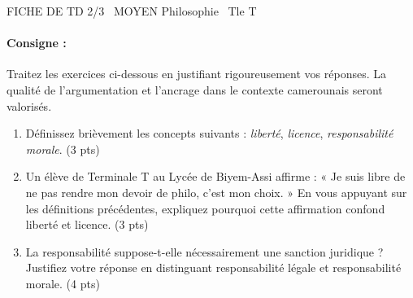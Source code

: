 \documentclass[11pt]{article}
\begin{document}
\begin{tcolorbox}[enhanced,colback=popink,colframe=popink,arc=10pt,boxrule=0pt,left=12pt,right=12pt,top=9pt,bottom=9pt]
{\color{white}\popxbold\small FICHE DE TD 2/3 \textbullet\ MOYEN \hfill Philosophie \textbullet\ Tle T\par}
\end{tcolorbox}
\vspace{4pt}
\paragraph{Consigne :} Traitez les exercices ci-dessous en justifiant rigoureusement vos réponses. La qualité de l'argumentation et l'ancrage dans le contexte camerounais seront valorisés.

\begin{exercice}
    \begin{enumerate}
        \item Définissez brièvement les concepts suivants : \textit{liberté}, \textit{licence}, \textit{responsabilité morale}. (3 pts)
        \item Un élève de Terminale T au Lycée de Biyem-Assi affirme : « Je suis libre de ne pas rendre mon devoir de philo, c'est mon choix. » En vous appuyant sur les définitions précédentes, expliquez pourquoi cette affirmation confond liberté et licence. (3 pts)
        \item La responsabilité suppose-t-elle nécessairement une sanction juridique ? Justifiez votre réponse en distinguant responsabilité légale et responsabilité morale. (4 pts)
    \end{enumerate}
\end{exercice}
\end{document}
